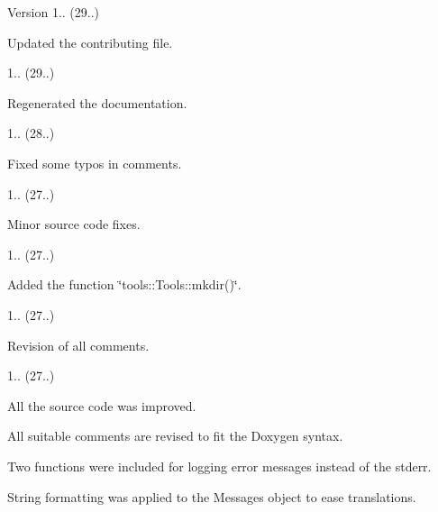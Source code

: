 \begin{DoxyVersion}{Version}
1.. (29..)
\begin{DoxyItemize}
\item Updated the contributing file. 
\end{DoxyItemize}

1.. (29..)
\begin{DoxyItemize}
\item Regenerated the documentation. 
\end{DoxyItemize}

1.. (28..)
\begin{DoxyItemize}
\item Fixed some typos in comments. 
\end{DoxyItemize}

1.. (27..)
\begin{DoxyItemize}
\item Minor source code fixes. 
\end{DoxyItemize}

1.. (27..)
\begin{DoxyItemize}
\item Added the function \char`\"{}tools\+::\+Tools\+::mkdir()\char`\"{}. 
\end{DoxyItemize}

1.. (27..)
\begin{DoxyItemize}
\item Revision of all comments. 
\end{DoxyItemize}

1.. (27..)
\begin{DoxyItemize}
\item All the source code was improved.
\item All suitable comments are revised to fit the Doxygen syntax.
\item Two functions were included for logging error messages instead of the stderr.
\item String formatting was applied to the Messages object to ease translations. 
\end{DoxyItemize}
\end{DoxyVersion}
